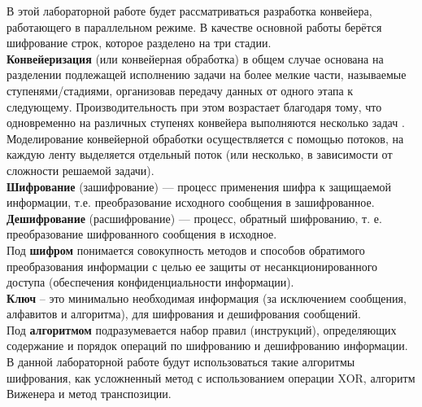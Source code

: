 В этой лабораторной работе будет рассматриваться разработка конвейера, работающего в параллельном режиме. В качестве основной работы берётся шифрование строк, которое разделено на три стадии. \\

\textbf{Конвейеризация} (или конвейерная обработка) в общем случае основана на разделении подлежащей исполнению задачи на более мелкие части, называемые ступенями/стадиями, организовав передачу данных от одного этапа к следующему.  Производительность при этом возрастает благодаря тому, что одновременно на различных ступенях конвейера выполняются несколько задач \cite{Conveyor}.\\

Моделирование конвейерной обработки осуществляется с помощью потоков, на каждую ленту выделяется отдельный поток (или несколько, в зависимости от сложности решаемой задачи).\\

\textbf{Шифрование} (зашифрование) — процесс применения шифра к защищаемой информации, т.е. преобразование исходного сообщения в зашифрованное.\\

\textbf{Дешифрование} (расшифрование) — процесс, обратный шифрованию, т. е. преобразование шифрованного сообщения в исходное.\\

Под \textbf{шифром} понимается совокупность методов и способов обратимого преобразования информации с целью ее защиты от несанкционированного доступа (обеспечения конфиденциальности информации).\\

\textbf{Ключ} – это минимально необходимая информация (за исключением сообщения, алфавитов и алгоритма), для шифрования и дешифрования сообщений.\\

Под \textbf{алгоритмом} подразумевается набор правил (инструкций), определяющих содержание и порядок операций по шифрованию и дешифрованию информации.\\

В данной лабораторной работе будут использоваться такие алгоритмы шифрования, как усложненный метод с использованием операции XOR, алгоритм Виженера и метод транспозиции. 















